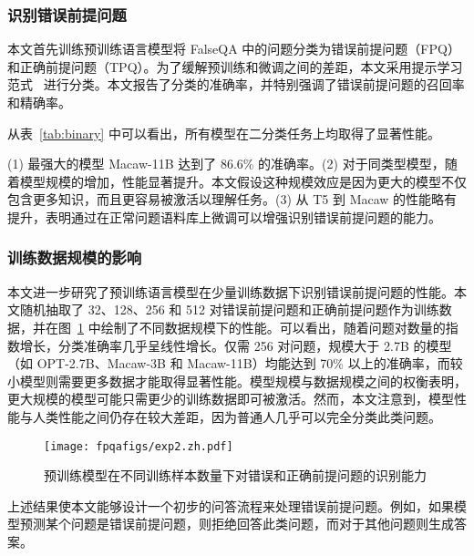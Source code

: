 \subsubsection{识别错误前提问题}
本文首先训练预训练语言模型将 FalseQA 中的问题分类为错误前提问题（FPQ）和正确前提问题（TPQ）。为了缓解预训练和微调之间的差距，本文采用提示学习范式~\cite{schick-schutze-2021-exploiting,10.1145/3560815} 进行分类。本文报告了分类的准确率，并特别强调了错误前提问题的召回率和精确率。

从表~\ref{tab:binary} 中可以看出，所有模型在二分类任务上均取得了显著性能。

(1) 最强大的模型 Macaw-11B 达到了 86.6\% 的准确率。(2) 对于同类型模型，随着模型规模的增加，性能显著提升。本文假设这种规模效应是因为更大的模型不仅包含更多知识，而且更容易被激活以理解任务。(3) 从 T5 到 Macaw 的性能略有提升，表明通过在正常问题语料库上微调可以增强识别错误前提问题的能力。

\subsubsection{训练数据规模的影响}
本文进一步研究了预训练语言模型在少量训练数据下识别错误前提问题的性能。本文随机抽取了 32、128、256 和 512 对错误前提问题和正确前提问题作为训练数据，并在图~\ref{fig:scale} 中绘制了不同数据规模下的性能。可以看出，随着问题对数量的指数增长，分类准确率几乎呈线性增长。仅需 256 对问题，规模大于 2.7B 的模型（如 OPT-2.7B、Macaw-3B 和 Macaw-11B）均能达到 70\% 以上的准确率，而较小模型则需要更多数据才能取得显著性能。模型规模与数据规模之间的权衡表明，更大规模的模型可能只需更少的训练数据即可被激活。然而，本文注意到，模型性能与人类性能之间仍存在较大差距，因为普通人几乎可以完全分类此类问题。

\begin{figure}
    \centering
    \texttt{[image: fpqafigs/exp2.zh.pdf]}
    \caption{预训练模型在不同训练样本数量下对错误和正确前提问题的识别能力}
    \label{fig:scale}
\end{figure}

上述结果使本文能够设计一个初步的问答流程来处理错误前提问题。例如，如果模型预测某个问题是错误前提问题，则拒绝回答此类问题，而对于其他问题则生成答案。


